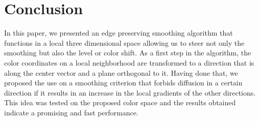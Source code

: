 \section{Conclusion}
In this paper, we presented an edge preserving smoothing algorithm that functions in a local three dimensional space allowing us to steer not only the smoothing but also the level or color shift. As a first step in the algorithm, the color coordinates on a local neighborhood are transformed to a direction that is along the center vector and a plane orthogonal to it. Having done that, we proposed the use on a smoothing criterion that forbids diffusion in a certain direction if it results in an increase in the local gradients of the other directions. This idea was tested on the proposed color space and the results obtained indicate a promising and fast performance.     